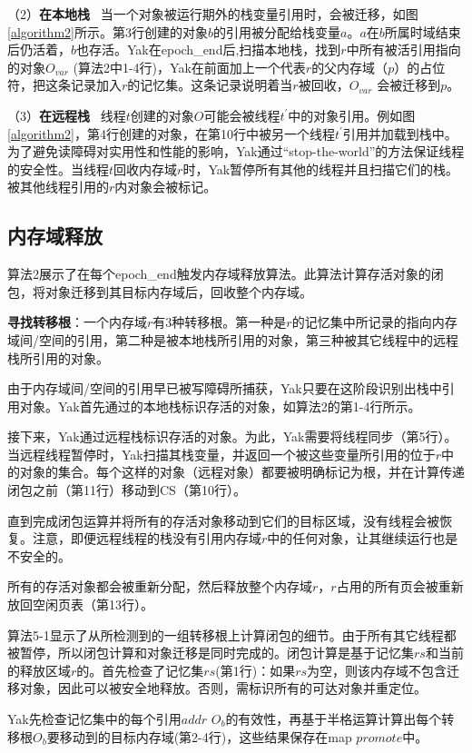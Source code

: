 （2）\textbf{在本地栈} \ 当一个对象被运行期外的栈变量引用时，会被迁移，如图\ref{algorithm2}所示。第3行创建的对象$b$的引用被分配给栈变量$a$。$a$在$b$所属时域结束后仍活着，$b$也存活。Yak在epoch\_end后,扫描本地栈，找到$r$中所有被活引用指向的对象$O_{var}$ (算法2中1-4行)，Yak在前面加上一个代表$r$的父内存域（$p$）的占位符，把这条记录加入$r$的记忆集。这条记录说明着当$r$被回收，$O_{var}$ 会被迁移到$p$。

（3）\textbf{在远程栈} \ 线程$t$创建的对象$O$可能会被线程$t^{'}$中的对象引用。例如图\ref{algorithm2}，第4行创建的对象，在第10行中被另一个线程$t^{'}$引用并加载到栈中。为了避免读障碍对实用性和性能的影响，Yak通过“stop-the-world”的方法保证线程的安全性。当线程$t$回收内存域$r$时，Yak暂停所有其他的线程并且扫描它们的栈。被其他线程引用的$r$内对象会被标记。

\subsection{内存域释放}
算法2展示了在每个epoch\_end触发内存域释放算法。此算法计算存活对象的闭包，将对象迁移到其目标内存域后，回收整个内存域。

\textbf{寻找转移根}：一个内存域$r$有3种转移根。第一种是$r$的记忆集中所记录的指向内存域间/空间的引用，第二种是被本地栈所引用的对象，第三种被其它线程中的远程栈所引用的对象。

由于内存域间/空间的引用早已被写障碍所捕获，Yak只要在这阶段识别出栈中引用对象。Yak首先通过的本地栈标识存活的对象，如算法2的第1-4行所示。

接下来，Yak通过远程栈标识存活的对象。为此，Yak需要将线程同步（第5行）。当远程线程暂停时，Yak扫描其栈变量，并返回一个被这些变量所引用的位于$r$中的对象的集合。每个这样的对象（远程对象）都要被明确标记为根，并在计算传递闭包之前（第11行）移动到CS（第10行）。

直到完成闭包运算并将所有的存活对象移动到它们的目标区域，没有线程会被恢复。注意，即便远程线程的栈没有引用内存域$r$中的任何对象，让其继续运行也是不安全的。

所有的存活对象都会被重新分配，然后释放整个内存域$r$，$r$占用的所有页会被重新放回空闲页表（第13行）。



算法5-1显示了从所检测到的一组转移根上计算闭包的细节。由于所有其它线程都被暂停，所以闭包计算和对象迁移是同时完成的。闭包计算是基于记忆集$rs$和当前的释放区域$r$的。首先检查了记忆集$rs$(第1行)：如果$rs$为空，则该内存域不包含迁移对象，因此可以被安全地释放。否则，需标识所有的可达对象并重定位。

Yak先检查记忆集中的每个引用${addr}$  $O_{b}$的有效性，再基于半格运算计算出每个转移根$O_{b}$要移动到的目标内存域(第2-4行)，这些结果保存在map $promote$中。

